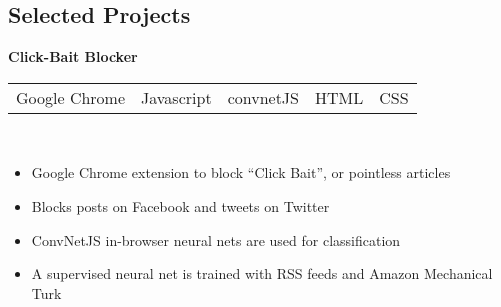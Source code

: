 \documentclass[resmargin,line,12pt]{res}
\begin{document}
{\begin{resume}
\vspace*{.20in}
{\color{Black}
  \vspace{-.13in}
  \section{\sc Selected Projects}}
\color{black}


{\bf Click-Bait Blocker} \
\\
\begin{tabular}{l l l l l}
  Google Chrome & Javascript & convnetJS & HTML & CSS 
\end{tabular}
\\
\vspace{-.16in}
\begin{itemize}
  \item Google Chrome extension to block ``Click Bait'', or pointless articles
  \item Blocks posts on Facebook and tweets on Twitter
  \item ConvNetJS in-browser neural nets are used for classification
  \item A supervised neural net is trained with RSS feeds and Amazon Mechanical Turk
\end{itemize}
\vspace{-.10in}


\end{resume}}
\end{document}
